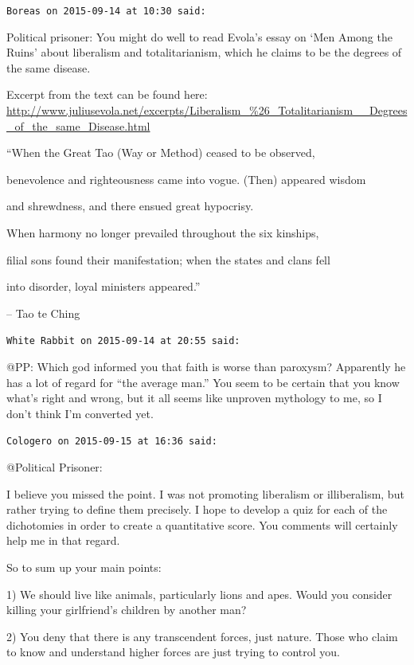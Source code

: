 \begin{footnotesize}
\begin{sffamily}
\hfill

\texttt{Boreas on 2015-09-14 at 10:30 said:}

Political prisoner: You might do well to read Evola's essay on `Men Among the Ruins' about liberalism and totalitarianism, which he claims to be the degrees of the same disease.

Excerpt from the text can be found here:
\url{http://www.juliusevola.net/excerpts/Liberalism\_\%26\_Totalitarianism\_\_Degrees\_of\_the\_same\_Disease.html}


``When the Great Tao (Way or Method) ceased to be observed,

benevolence and righteousness came into vogue. (Then) appeared wisdom

and shrewdness, and there ensued great hypocrisy.

When harmony no longer prevailed throughout the six kinships,

filial sons found their manifestation; when the states and clans fell

into disorder, loyal ministers appeared.''

-- Tao te Ching

\hfill

\texttt{White Rabbit on 2015-09-14 at 20:55 said:}

@PP: Which god informed you that faith is worse than paroxysm? Apparently he has a lot of regard for ``the average man.'' You seem to be certain that you know what's right and wrong, but it all seems like unproven mythology to me, so I don't think I'm converted yet.

\hfill

\texttt{Cologero on 2015-09-15 at 16:36 said:}

@Political Prisoner:

I believe you missed the point. I was not promoting liberalism or illiberalism, but rather trying to define them precisely. I hope to develop a quiz for each of the dichotomies in order to create a quantitative score. You comments will certainly help me in that regard.

So to sum up your main points:

1) We should live like animals, particularly lions and apes. Would you consider killing your girlfriend's children by another man?

2) You deny that there is any transcendent forces, just nature. Those who claim to know and understand higher forces are just trying to control you.


\end{sffamily}
\end{footnotesize}
